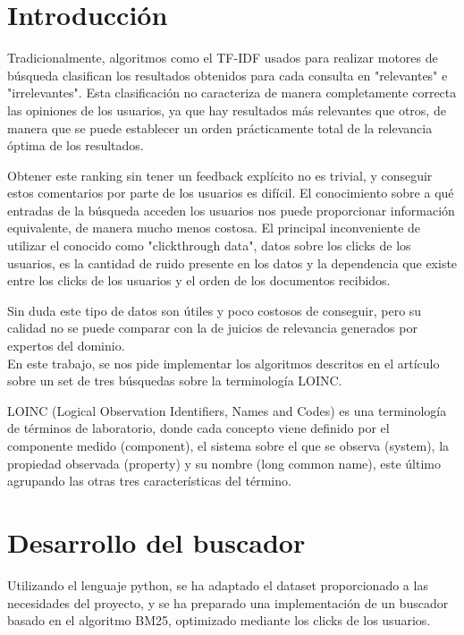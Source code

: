 \documentclass[a4paper,12pt]{article}
\begin{document}
	
	\setlength{\parindent}{0.5cm}
	\setlength{\voffset}{-2cm}
	\setlength{\hoffset}{-2cm}
	
	
	

	
	\section{Introducción}
	Tradicionalmente, algoritmos como el TF-IDF usados para realizar motores de búsqueda clasifican los resultados obtenidos para cada consulta en "relevantes" e "irrelevantes". Esta clasificación no caracteriza de manera completamente correcta las opiniones de los usuarios, ya que hay resultados más relevantes que otros, de manera que se puede establecer un orden prácticamente total de la relevancia óptima de los resultados.
	
	Obtener este ranking sin tener un feedback explícito no es trivial, y conseguir estos comentarios por parte de los usuarios es difícil. El conocimiento sobre a qué entradas de la búsqueda acceden los usuarios nos puede proporcionar información equivalente, de manera mucho menos costosa. El principal inconveniente de utilizar el conocido como "clickthrough data", datos sobre los clicks de los usuarios, es la cantidad de ruido presente en los datos y la dependencia que existe entre los clicks de los usuarios y el orden de los documentos recibidos.
	
	Sin duda este tipo de datos son útiles y poco costosos de conseguir, pero su calidad no se puede comparar con la de juicios de relevancia generados por expertos del dominio.\\
	
	En este trabajo, se nos pide implementar los algoritmos descritos en el artículo \cite{articulo-clase} sobre un set de tres búsquedas sobre la terminología LOINC.
	
	LOINC (Logical Observation Identifiers, Names and Codes)\cite{loinc} es una terminología de términos de laboratorio, donde cada concepto viene definido por el componente medido (component), el sistema sobre el que se observa (system), la propiedad observada (property) y su nombre (long common name), este último agrupando las otras tres características del término.
	
	\section{Desarrollo del buscador}
	Utilizando el lenguaje python, se ha adaptado el dataset proporcionado a las necesidades del proyecto, y se ha preparado una implementación de un buscador basado en el algoritmo BM25, optimizado mediante los clicks de los usuarios.
	
\end{document}
